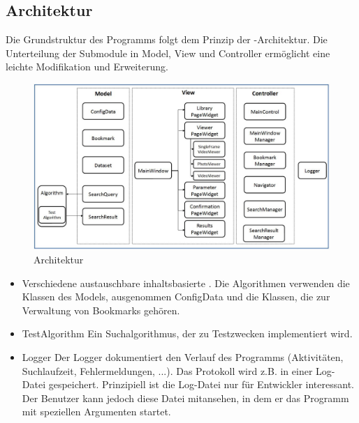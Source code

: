 \subsection{Architektur}

Die Grundstruktur des Programms folgt dem Prinzip der -Architektur. Die Unterteilung der Submodule in Model, View und Controller ermöglicht eine leichte Modifikation und Erweiterung.

\begin{figure}[H]
\includegraphics[width=1\linewidth]{img/architektur}
\caption{Architektur}
\label{fig:architektur}
\end{figure}

\begin{itemize}
\item {}\newline
Verschiedene austauschbare inhaltsbasierte . Die Algorithmen verwenden die Klassen des Models, ausgenommen ConfigData und die Klassen, die zur Verwaltung von Bookmarks gehören. 
\item TestAlgorithm\newline
Ein \gls{Suchalgorithmus}, der zu Testzwecken implementiert wird.
\item Logger \newline
Der Logger dokumentiert den Verlauf des Programms (Aktivitäten, Suchlaufzeit, Fehlermeldungen, ...). Das Protokoll wird z.B. in einer Log-Datei gespeichert. Prinzipiell ist die Log-Datei nur für Entwickler interessant. Der Benutzer kann jedoch diese Datei mitansehen, in dem er das Programm mit speziellen Argumenten startet.
\end{itemize}

